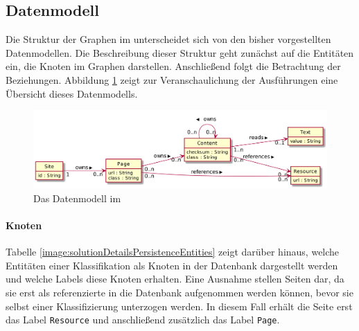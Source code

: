 \subsection{Datenmodell}
    \label{section:solutionDetailsPersistenceDataModel}
    Die Struktur der Graphen im {\classificationStorage} unterscheidet
    sich von den bisher vorgestellten Datenmodellen.
    Die Beschreibung dieser Struktur geht zunächst auf die Entitäten ein,
    die Knoten im Graphen darstellen.
    Anschließend folgt die Betrachtung der Beziehungen.
    Abbildung \ref{image:dbDataModelOverview} zeigt zur Veranschaulichung
    der Ausführungen eine Übersicht dieses Datenmodells.

    \begin{figure}
        \centering
        \includegraphics[scale=\imageScalingFactor]{../resources/db-data-model/nodes.png}
        \caption{Das Datenmodell im {\classificationStorage}}
        \label{image:dbDataModelOverview}
    \end{figure}

    \paragraph{Knoten}
    Tabelle \ref{image:solutionDetailsPersistenceEntities} zeigt darüber hinaus,
    welche Entitäten einer Klassifikation als Knoten in der Datenbank dargestellt werden
    und welche Labels diese Knoten erhalten.
    Eine Ausnahme stellen Seiten dar,
    da sie erst als referenzierte {\resources} in die Datenbank aufgenommen werden können,
    bevor sie selbst einer Klassifizierung unterzogen werden.
    In diesem Fall erhält die Seite erst das Label \texttt{Resource} und anschließend zusätzlich
    das Label \texttt{Page}.

